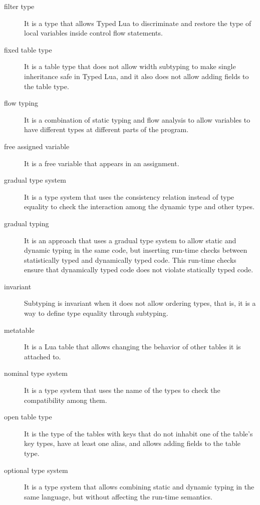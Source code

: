 \begin{description}
\item[filter type] It is a type that allows Typed Lua to discriminate and restore the type of
local variables inside control flow statements.

\item[fixed table type] It is a table type that does not allow width subtyping to make single
inheritance safe in Typed Lua, and it also does not allow adding fields to
the table type.

\item[flow typing] It is a combination of static typing and flow analysis to allow variables
to have different types at different parts of the program.

\item[free assigned variable] It is a free variable that appears in an assignment.

\item[gradual type system] It is a type system that uses the consistency relation instead of type equality
to check the interaction among the dynamic type and other types.

\item[gradual typing] It is an approach that uses a gradual type system to allow static and dynamic
typing in the same code, but inserting run-time checks between statistically
typed and dynamically typed code.
This run-time checks ensure that dynamically typed code does not violate
statically typed code.

\item[invariant] Subtyping is invariant when it does not allow ordering types, that is,
it is a way to define type equality through subtyping.

\item[metatable] It is a Lua table that allows changing the behavior of other tables
it is attached to.

\item[nominal type system] It is a type system that uses the name of the types to check the
compatibility among them.

\item[open table type] It is the type of the tables with keys that do not inhabit one of
the table's key types, have at least one alias, and allows adding
fields to the table type.

\item[optional type system] It is a type system that allows combining static and dynamic typing in the same
language, but without affecting the run-time semantics.


\end{description}
